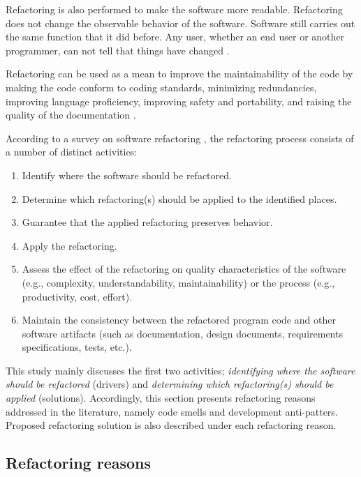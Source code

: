 Refactoring is also performed to make the software more readable. Refactoring does not change the observable behavior of the software. Software still carries out the same function that it did before. Any user, whether an end user or another programmer, can not tell that things have changed \cite{fowlerRefactor}.  

Refactoring can be used as a mean to improve the maintainability of the code by making the code conform to coding standards, minimizing redundancies, improving language proficiency, improving safety and portability, and raising the quality of the documentation \cite{siyInspection}.


According to a survey on software refactoring \cite{mensSurvey}, the refactoring process consists of a number of distinct activities:

\begin{enumerate}
\item Identify where the software should be refactored.
\item Determine which refactoring(s) should be applied to the identified places.
\item Guarantee that the applied refactoring preserves behavior.
\item Apply the refactoring.
\item Assess the effect of the refactoring on quality characteristics of the software (e.g., complexity, understandability, maintainability) or the process (e.g., productivity, cost, effort).
\item Maintain the consistency between the refactored program code and other software artifacts (such as documentation, design documents, requirements specifications, tests, etc.).
\end{enumerate}

This study mainly discusses the first two activities; \textit{identifying where the software should be refactored} (drivers) and \textit{determining which refactoring(s) should be applied} (solutions). Accordingly, this section presents refactoring reasons addressed in the literature, namely code smells and development anti-patters. Proposed refactoring solution is also described under each refactoring reason.

\subsection{Refactoring reasons}  

